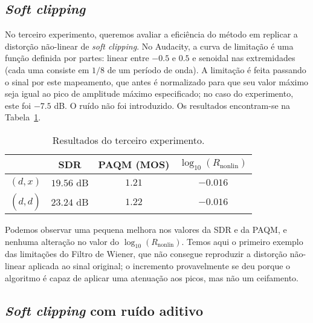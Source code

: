 \subsection{\textit{Soft clipping}}

No terceiro experimento, queremos avaliar a eficiência do método em replicar a distorção não-linear de \textit{soft clipping}. No Audacity, a curva de limitação é uma função definida por partes: linear entre $-0.5$ e $0.5$ e senoidal nas extremidades (cada uma consiste em $1/8$ de um período de onda). A limitação é feita passando o sinal por este mapeamento, que antes é normalizado para que seu valor máximo seja igual ao pico de amplitude máximo especificado; no caso do experimento, este foi $-7.5$ dB. O ruído não foi introduzido. Os resultados encontram-se na Tabela~\ref{tab:wf:experiment-3}.
{\def\arraystretch{1.25}\tabcolsep=10pt
\begin{table}[!ht]
    \centering
    \caption[Resultados do terceiro experimento: \textit{soft clipping}]{Resultados do terceiro experimento.}
    \label{tab:wf:experiment-3}
    \begin{tabular}{cccc}
        \toprule
                         & SDR        & PAQM (MOS)  & $\log_{10}(R_{\text{nonlin}})$ \\
        \midrule
        $(d, x)$       & $19.56$ dB & $1.21$  & $-0.016$                 \\
        $(d, \hat{d})$ & $23.24$ dB & $1.22$ & $-0.016$                \\ \bottomrule
    \end{tabular}
\end{table}
}

Podemos observar uma pequena melhora nos valores da SDR e da PAQM, e nenhuma alteração no valor do $\log_{10}(R_{\text{nonlin}})$. Temos aqui o primeiro exemplo das limitações do Filtro de Wiener, que não consegue reproduzir a distorção não-linear aplicada ao sinal original; o incremento provavelmente se deu porque o algoritmo é capaz de aplicar uma atenuação aos picos, mas não um ceifamento.

\subsection{\textit{Soft clipping} com ruído aditivo}

